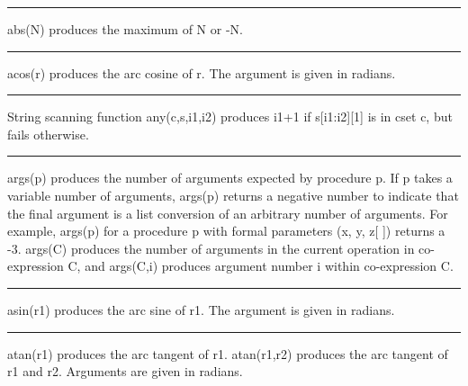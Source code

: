 \bigskip

\hrule\vspace{0.1cm}

\noindent {}\textsf{abs(N)} produces the maximum of
\textsf{N} or \textsf{{}-N}.

\bigskip

\hrule\vspace{0.1cm}

\noindent
{}\textsf{acos(r)} produces the arc cosine of
\textsf{r}. The argument is given in radians.

\bigskip

\hrule\vspace{0.1cm}

\noindent
{}String scanning function
\textsf{any(c,s,i1,i2)} produces \textsf{i1+1} if \textsf{s[i1:i2][1]}
is in cset \textsf{c}, but fails otherwise.

\bigskip

\hrule\vspace{0.1cm}

\noindent
{}\textsf{args(p)} produces the number of arguments
expected by procedure \textsf{p}. If \textsf{p} takes a variable number
of arguments, \textsf{args(p)} returns a negative number to indicate
that the final argument is a list conversion of an arbitrary number of
arguments. For example, \textsf{args(p)} for a procedure \textsf{p}
with formal parameters \textsf{(x, y, z[ ])} returns a \textsf{{}-3}.
\textsf{args(C)} produces the number of arguments in the current
operation in co-expression \textsf{C}, and \textsf{args(C,i)} produces
argument number \textsf{i} within co-expression \textsf{C}.

\bigskip

\hrule\vspace{0.1cm}

\noindent
{}\textsf{asin(r1)} produces the arc sine of \textsf{r1}.
The argument is given in radians.

\bigskip

\hrule\vspace{0.1cm}

\noindent
{}\textsf{atan(r1)} produces the arc tangent of
\textsf{r1}. \textsf{atan(r1,r2)} produces the arc tangent of
\textsf{r1} and \textsf{r2}. Arguments are given in radians.


